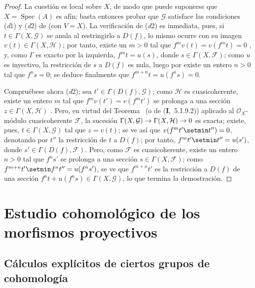 \documentclass[10pt,oneside,openany]{book}
\theoremstyle{egaenv}\newtheorem*{env}{---}
\theoremstyle{egastatement}
\theoremstyle{egadescription}
\newcommand{\oldpage}[2][]{\marginnote{\normalfont\scriptsize\textbf{#1}\,|\,#2}\ignorespaces}
\renewcommand{\to}{\mathchoice{\longrightarrow}{\rightarrow}{\rightarrow}{\rightarrow}}
\begin{document}
\oldpage[III]{95}
\begin{proof}
La cuestión es local sobre $X$, de modo que puede suponerse que $X=\operatorname{Spec}(A)$ es afín; basta entonces probar que $\mathcal G$ satisface las condiciones (\textit{d}1) y (\textit{d}2) de  (con $V=X$).
La verificación de (\textit{d}2) es inmediata, pues, si $t\in\Gamma(X,\mathcal G)$ se anula al restringirlo a $D(f)$, lo mismo ocurre con su imagen $v(t)\in\Gamma(X,\mathcal H)$; por tanto, existe un $m>0$ tal que $f^mv(t)=v(f^mt)=0$ , y, como $\Gamma$ es exacto por la izquierda, $f^mt=u(s)$, donde $s\in\Gamma(X,\mathcal F)$; como $u$ es inyectivo, la restricción de $s$ a $D(f)$ es nula, luego por  existe un entero $n>0$ tal que $f^ns=0$; se deduce finalmente que $f^{m+n}t=u(f^ns)=0$.

Compruébese ahora (\textit{d}2); sea $t'\in\Gamma(D(f),\mathcal G)$; como $\mathcal H$ es cuasicoherente, existe un entero $m$ tal que $f^mv(t')=v(f^mt')$ se prolonga a una sección $z\in\Gamma(X,\mathcal H)$ .
Pero, en virtud del Teorema~ (o de (\textbf{I},~5.1.9.2)) aplicado al $\mathcal O_X$-módulo cuasicoherente $\mathcal F$, la sucesión $\Gamma(X,\mathcal G)\to\Gamma(X,\mathcal H)\to0$ es exacta; existe, pues, $t\in\Gamma(X,\mathcal G)$ tal que $z=v(t)$; se ve así que $v(f^mt'\setmin t'')=0$, denotando por $t''$ la restricción de $t$ a $D(f)$; por tanto, $f^mt'\setmin t''=u(s')$, donde $s'\in\Gamma(D(f),\mathcal F)$.
Pero, como $\mathcal F$ es cuasicoherente, existe un entero $n>0$ tal que $f^ns'$ se prolonga a una sección $s\in\Gamma(X,\mathcal F)$; como $f^{m+n}t'\setmin f^nt''=u(f^ns')$, se ve que $f^{m+n}t'$ es la restricción a $D(f)$ de una sección $f^nt+u(f^ns)\in\Gamma(X,\mathcal G)$, lo que termina la demostración.
\end{proof}



\section{Estudio cohomológico de los morfismos proyectivos}
\label{section:III.2}
\label{section:III.2-fr}


\subsection{Cálculos explícitos de ciertos grupos de cohomología}
\label{subsection:III.2.1}
\label{subsection:III.2.1-fr}
\end{document}
